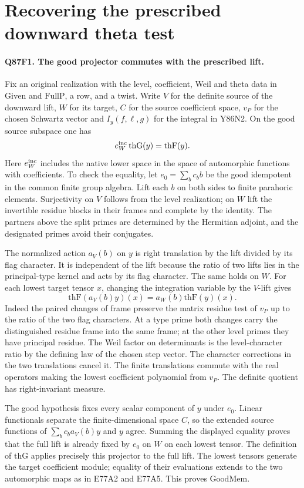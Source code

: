 \section{Recovering the prescribed downward theta test}

\paragraph{Q87F1. The good projector commutes with the prescribed lift.}
Fix an original realization with the level, coefficient, Weil and
theta data in $\mathrm{Given}$ and $\mathrm{FullP}$, a row, and a twist.
Write $V$ for the definite source of the downward lift, $W$ for its
target, $C$ for the source coefficient space, $v_P$ for the chosen
Schwartz vector and $I_y(f,\ell,g)$ for the integral in Y86N2.
On the good source subspace one has
\[
             e_W^{\rm inc}\,\mathrm{thG}(y)=\mathrm{thF}(y).
\]
Here $e_W^{\rm inc}$ includes the native lower space in the space of
automorphic functions with coefficients. To check the equality, let
$e_0=\sum_b c_b b$ be the good idempotent in the common finite group
algebra. Lift each $b$ on both sides to finite parahoric elements.
Surjectivity on $V$ follows from the level realization; on $W$ lift
the invertible residue blocks in their frames and complete by the
identity. The partners above the split primes are determined by the
Hermitian adjoint, and the designated primes avoid their conjugates.

The normalized action $a_V(b)$ on $y$ is right translation by the
lift divided by its flag character. It is independent of the lift
because the ratio of two lifts lies in the principal-type kernel and
acts by its flag character. The same holds on $W$. For each lowest
target tensor $x$, changing the integration variable by the $V$-lift
gives
\[
 \mathrm{thF}(a_V(b)y)(x)
       =a_W(b)\mathrm{thF}(y)(x).
\]
Indeed the paired changes of frame preserve the matrix residue test
of $v_P$ up to the ratio of the two flag characters. At a type
prime both changes carry the distinguished residue frame into the
same frame; at the other level primes they have principal residue.
The Weil factor on determinants is the level-character ratio by
the defining law of the chosen step vector. The character
corrections in the two translations cancel it.
The finite translations commute with the real operators making
the lowest coefficient polynomial from $v_P$. The definite quotient
has right-invariant measure.

The good hypothesis fixes every scalar component of $y$ under
$e_0$. Linear functionals separate the finite-dimensional space $C$,
so the extended source functions of $\sum_b c_b a_V(b)y$ and $y$
agree. Summing the displayed equality proves that the full lift is
already fixed by $e_0$ on $W$ on each lowest tensor. The definition
of $\mathrm{thG}$ applies precisely this projector to the full lift.
The lowest tensors generate the target coefficient module; equality
of their evaluations extends to the two automorphic maps as in
E77A2 and E77A5. This proves $\mathrm{GoodMem}$.

